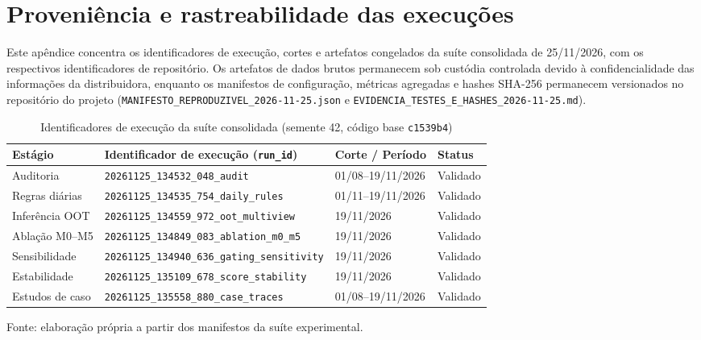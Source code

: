 \chapter{Proveniência e rastreabilidade das execuções}\label{ap:proveniencia}

Este apêndice concentra os identificadores de execução, cortes e artefatos congelados da suíte consolidada de 25/11/2026, com os respectivos identificadores de repositório. Os artefatos de dados brutos permanecem sob custódia controlada devido à confidencialidade das informações da distribuidora, enquanto os manifestos de configuração, métricas agregadas e hashes SHA-256 permanecem versionados no repositório do projeto (\texttt{MANIFESTO\_REPRODUZIVEL\_2026-11-25.json} e \texttt{EVIDENCIA\_TESTES\_E\_HASHES\_2026-11-25.md}).

\begin{table}[htbp]\centering\footnotesize\caption{Identificadores de execução da suíte consolidada (semente 42, código base \texttt{c1539b4})}\label{tab:ap-proveniencia}
\begin{tabular}{llll}\toprule
Estágio & Identificador de execução (\texttt{run\_id}) & Corte / Período & Status \\ \midrule
Auditoria & \texttt{20261125\_134532\_048\_audit} & 01/08--19/11/2026 & Validado \\
Regras diárias & \texttt{20261125\_134535\_754\_daily\_rules} & 01/11--19/11/2026 & Validado \\
Inferência OOT & \texttt{20261125\_134559\_972\_oot\_multiview} & 19/11/2026 & Validado \\
Ablação M0--M5 & \texttt{20261125\_134849\_083\_ablation\_m0\_m5} & 19/11/2026 & Validado \\
Sensibilidade & \texttt{20261125\_134940\_636\_gating\_sensitivity} & 19/11/2026 & Validado \\
Estabilidade & \texttt{20261125\_135109\_678\_score\_stability} & 19/11/2026 & Validado \\
Estudos de caso & \texttt{20261125\_135558\_880\_case\_traces} & 01/08--19/11/2026 & Validado \\
\bottomrule\end{tabular}
\par\small Fonte: elaboração própria a partir dos manifestos da suíte experimental.
\end{table}
